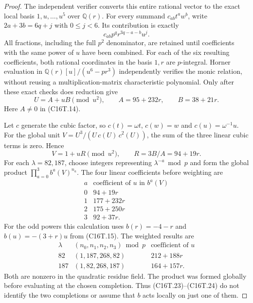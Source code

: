 \begin{proof}
The independent verifier converts this entire rational vector
to the exact local basis $1,u,\ldots,u^5$ over $\mathbb Q(r)$.
For every summand $c_{ab}t^a w^b$, write
$2a+3b=6q+j$ with $0\leq j<6$.  Its contribution is exactly
\[
             c_{ab}p^q r^{3q-a-b}u^j.
 \tag{C16T.20}
\]
All fractions, including the full $p^2$ denominator, are retained
until coefficients with the same power of $u$ have been combined.
For each of the six resulting coefficients, both rational
coordinates in the basis $1,r$ are $p$-integral.
Horner evaluation in
$\mathbb Q(r)[u]/(u^6-pr^3)$ independently verifies the monic
relation, without reusing a multiplication-matrix characteristic
polynomial.  Only after these exact checks does reduction give
\[
            U=A+uB\pmod{u^2},\qquad
            A=95+232r,\qquad B=38+21r.
 \tag{C16T.21}
\]
Here $A\ne0$ in (C16T.14).

Let $c$ generate the cubic factor, so $c(t)=\omega t$,
$c(w)=w$ and $c(u)=\omega^{-1}u$.
For the global unit
$V=U^3/(U\,c(U)\,c^2(U))$, the sum of the three linear
cubic terms is zero.  Hence
\[
              V=1+uR\pmod{u^2},\qquad
              R=3B/A=94+19r.
 \tag{C16T.22}
\]
For each $\lambda=82,187$, choose integers representing
$\lambda^{-a}\bmod p$ and form the global product
$\prod_{a=0}^3 b^a(V)^{n_a}$.
The four linear coefficients before weighting are
\[
 \begin{array}{c|c}
 a&\text{coefficient of }u\text{ in }b^a(V)\\ \hline
 0&94+19r\\
 1&177+232r\\
 2&175+250r\\
 3&92+37r .
 \end{array}
 \tag{C16T.23}
\]
For the odd powers this calculation uses
$b(r)=-4-r$ and $b(u)=-(3+r)u$ from (C16T.15).
The weighted results are
\[
 \begin{array}{c|c|c}
 \lambda&(n_0,n_1,n_2,n_3)\bmod p&
                    \text{coefficient of }u\\ \hline
 82&(1,187,268,82)&212+188r\\
 187&(1,82,268,187)&164+157r .
 \end{array}
 \tag{C16T.24}
\]
Both are nonzero in the quadratic residue field.
The product was formed globally before evaluating at the chosen
completion.  Thus (C16T.23)--(C16T.24) do not identify the two
completions or assume that $b$ acts locally on just one of them.


\end{proof}
